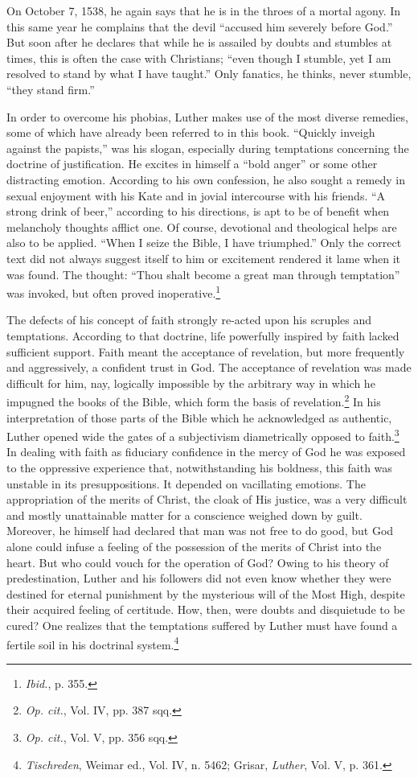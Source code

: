 On October 7, 1538, he again says that he is in the throes of a
mortal agony. In this same year he complains that the devil “accused
him severely before God.” But soon after he declares that while he is
assailed by doubts and stumbles at times, this is often the case with
Christians; “even though I stumble, yet I am resolved to stand by
what I have taught.” Only fanatics, he thinks, never stumble, “they
stand firm.”

In order to overcome his phobias, Luther makes use of the most
diverse remedies, some of which have already been referred to in
this book. “Quickly inveigh against the papists,” was his slogan,
especially during temptations concerning the doctrine of justification.
He excites in himself a “bold anger” or some other distracting
emotion. According to his own confession, he also sought a remedy in
sexual enjoyment with his Kate and in jovial intercourse with his
friends. “A strong drink of beer,” according to his directions, is apt
to be of benefit when melancholy thoughts afflict one. Of course,
devotional and theological helps are also to be applied. “When I seize
the Bible, I have triumphed.” Only the correct text did not always
suggest itself to him or excitement rendered it lame when it was
found. The thought: “Thou shalt become a great man through temptation”
was invoked, but often proved inoperative.\footnote{\textit{Ibid.}, p. 355.}

The defects of his concept of faith strongly re-acted upon his
scruples and temptations. According to that doctrine, life powerfully
inspired by faith lacked sufficient support. Faith meant the acceptance
of revelation, but more frequently and aggressively, a confident trust
in God. The acceptance of revelation was made difficult for him, nay,
logically impossible by the arbitrary way in which he impugned the
books of the Bible, which form the basis of revelation.\footnote
{\textit{Op. cit.}, Vol. IV, pp. 387 sqq.}
In his interpretation
of those parts of the Bible which he acknowledged as
authentic, Luther opened wide the gates of a subjectivism diametrically
opposed to faith.\footnote{\textit{Op. cit.}, Vol. V, pp. 356 sqq.}
In dealing with faith as fiduciary confidence
in the mercy of God he was exposed to the oppressive experience that,
notwithstanding his boldness, this faith was unstable in its presuppositions.
It depended on vacillating emotions. The appropriation of
the merits of Christ, the cloak of His justice, was a very difficult and
mostly unattainable matter for a conscience weighed down by guilt.
Moreover, he himself had declared that man was not free to do good,
but God alone could infuse a feeling of the possession of the merits
of Christ into the heart. But who could vouch for the operation
of God? Owing to his theory of predestination, Luther and his followers
did not even know whether they were destined for eternal
punishment by the mysterious will of the Most High, despite their
acquired feeling of certitude. How, then, were doubts and disquietude
to be cured? One realizes that the temptations suffered by Luther
must have found a fertile soil in his doctrinal system.\footnote{\textit{Tischreden}, Weimar ed., Vol. IV, n. 5462; Grisar, \textit{Luther}, Vol. V, p. 361.}


